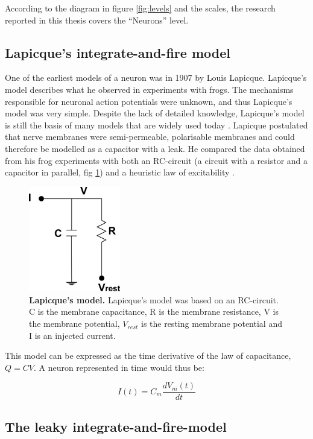 According to the diagram in figure \ref{fig:levels} and the scales, the research reported in this thesis covers the ``Neurons'' level. 

\subsection{Lapicque's integrate-and-fire model}

One of the earliest models of a neuron was in 1907 by Louis Lapicque. Lapicque's model describes what he observed in experiments with frogs. The mechanisms responsible for neuronal action potentials were unknown, and thus Lapicque's model was very simple. Despite the lack of detailed knowledge, Lapicque's model is still the basis of many models that are widely used today \cite{Abbott1999}. Lapicque postulated that nerve membranes were semi-permeable, polarisable membranes and could therefore be modelled as a capacitor with a leak. He compared the data obtained from his frog experiments with both an RC-circuit (a circuit with a resistor and a capacitor in parallel, fig \ref{fig:lapicque}) and a heuristic law of excitability \cite{Brunel2007}.

\begin{figure}[H]
	\centering
		\includegraphics[width=4cm]{graphics/lapicque.png}
		\caption[Lapicque's model]{\textbf{Lapicque's model.} Lapicque's model was based on an RC-circuit. C is the membrane capacitance, R is the membrane resistance, V is the membrane potential, $V_{rest}$ is the resting membrane potential and I is an injected current.}
		\label{fig:lapicque}
\end{figure}

This model can be expressed as the time derivative of the law of capacitance, $Q=CV$. A neuron represented in time would thus be:

\begin{equation}
\label{eq:lapicque}
I(t)=C_{m}\frac{dV_{m}(t)}{dt}
\end{equation}

\subsection{The leaky integrate-and-fire-model}

